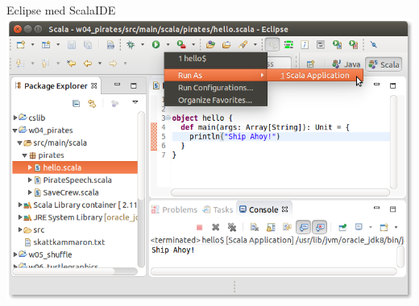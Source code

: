 \begin{Slide}{Eclipse med ScalaIDE}
\includegraphics[width=\textwidth]{../img/eclipse/eclipse-pirates-hello.png}
\end{Slide}
